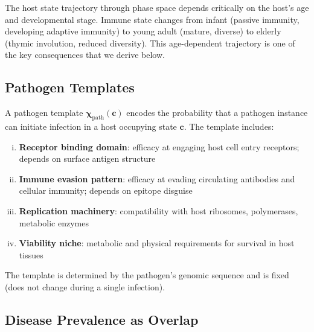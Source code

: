 \documentclass[11pt,twocolumn,a4paper]{article}
\newcommand{\Template}{\boldsymbol{\chi}}
\begin{document}
\begin{remark}
The host state trajectory through phase space depends critically on the host's age and developmental stage. Immune state changes from infant (passive immunity, developing adaptive immunity) to young adult (mature, diverse) to elderly (thymic involution, reduced diversity). This age-dependent trajectory is one of the key consequences that we derive below.
\end{remark}

\subsection{Pathogen Templates}

\begin{definition}
A pathogen template $\Template_{\mathrm{path}}(\mathbf{c})$ encodes the probability that a pathogen instance can initiate infection in a host occupying state $\mathbf{c}$. The template includes:
\begin{enumerate}[(i)]
\item \textbf{Receptor binding domain}: efficacy at engaging host cell entry receptors; depends on surface antigen structure
\item \textbf{Immune evasion pattern}: efficacy at evading circulating antibodies and cellular immunity; depends on epitope disguise
\item \textbf{Replication machinery}: compatibility with host ribosomes, polymerases, metabolic enzymes
\item \textbf{Viability niche}: metabolic and physical requirements for survival in host tissues
\end{enumerate}
The template is determined by the pathogen's genomic sequence and is fixed (does not change during a single infection).
\end{definition}

\subsection{Disease Prevalence as Overlap}
\end{document}
